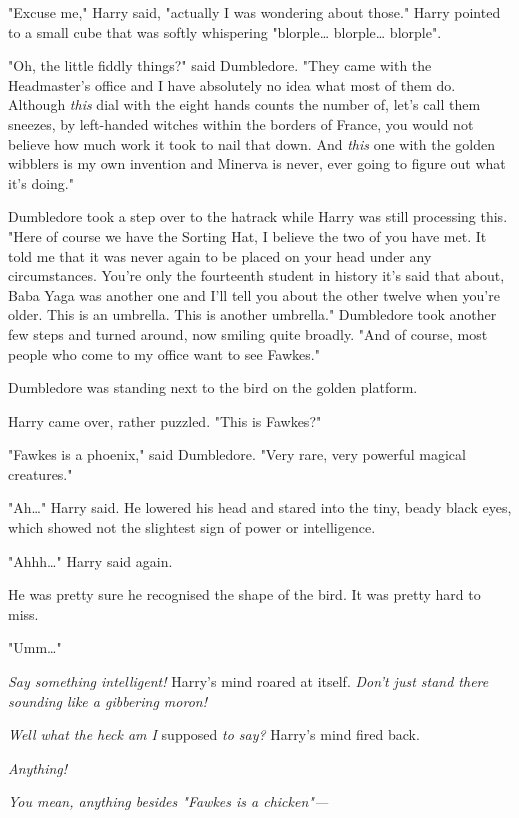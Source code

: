 "Excuse me," Harry said, "actually I was wondering about those." Harry pointed 
to a small cube that was softly whispering "blorple{\ldots} blorple{\ldots} 
blorple".

"Oh, the little fiddly things?" said Dumbledore. "They came with the 
Headmaster's office and I have absolutely no idea what most of them do. 
Although \emph{this} dial with the eight hands counts the number of, let's call 
them sneezes, by left-handed witches within the borders of France, you would 
not believe how much work it took to nail that down. And \emph{this} one with 
the golden wibblers is my own invention and Minerva is never, ever going to 
figure out what it's doing."

Dumbledore took a step over to the hatrack while Harry was still processing 
this. "Here of course we have the Sorting Hat, I believe the two of you have 
met. It told me that it was never again to be placed on your head under any 
circumstances. You're only the fourteenth student in history it's said that 
about, Baba Yaga was another one and I'll tell you about the other twelve when 
you're older. This is an umbrella. This is another umbrella." Dumbledore took 
another few steps and turned around, now smiling quite broadly. "And of course, 
most people who come to my office want to see Fawkes."

Dumbledore was standing next to the bird on the golden platform.

Harry came over, rather puzzled. "This is Fawkes?"

"Fawkes is a phoenix," said Dumbledore. "Very rare, very powerful magical 
creatures."

"Ah{\ldots}" Harry said. He lowered his head and stared into the tiny, beady 
black eyes, which showed not the slightest sign of power or intelligence.

"Ahhh{\ldots}" Harry said again.

He was pretty sure he recognised the shape of the bird. It was pretty hard to 
miss.

"Umm{\ldots}"

\emph{Say something intelligent!} Harry's mind roared at itself. \emph{Don't 
just stand there sounding like a gibbering moron!}

\emph{Well what the heck am I} supposed\emph{ to say?} Harry's mind fired back.

\emph{Anything!}

\emph{You mean, anything besides "Fawkes is a chicken"---}

